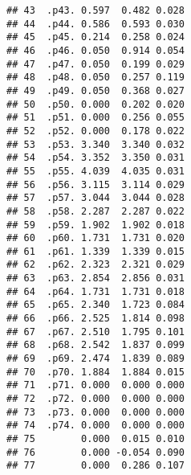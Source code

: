 \documentclass[
]{article}
\begin{document}
\begin{verbatim}
## 43  .p43. 0.597  0.482 0.028
## 44  .p44. 0.586  0.593 0.030
## 45  .p45. 0.214  0.258 0.024
## 46  .p46. 0.050  0.914 0.054
## 47  .p47. 0.050  0.199 0.029
## 48  .p48. 0.050  0.257 0.119
## 49  .p49. 0.050  0.368 0.027
## 50  .p50. 0.000  0.202 0.020
## 51  .p51. 0.000  0.256 0.055
## 52  .p52. 0.000  0.178 0.022
## 53  .p53. 3.340  3.340 0.032
## 54  .p54. 3.352  3.350 0.031
## 55  .p55. 4.039  4.035 0.031
## 56  .p56. 3.115  3.114 0.029
## 57  .p57. 3.044  3.044 0.028
## 58  .p58. 2.287  2.287 0.022
## 59  .p59. 1.902  1.902 0.018
## 60  .p60. 1.731  1.731 0.020
## 61  .p61. 1.339  1.339 0.015
## 62  .p62. 2.323  2.321 0.029
## 63  .p63. 2.854  2.856 0.031
## 64  .p64. 1.731  1.731 0.018
## 65  .p65. 2.340  1.723 0.084
## 66  .p66. 2.525  1.814 0.098
## 67  .p67. 2.510  1.795 0.101
## 68  .p68. 2.542  1.837 0.099
## 69  .p69. 2.474  1.839 0.089
## 70  .p70. 1.884  1.884 0.015
## 71  .p71. 0.000  0.000 0.000
## 72  .p72. 0.000  0.000 0.000
## 73  .p73. 0.000  0.000 0.000
## 74  .p74. 0.000  0.000 0.000
## 75        0.000  0.015 0.010
## 76        0.000 -0.054 0.090
## 77        0.000  0.286 0.107
\end{verbatim}
\end{document}
